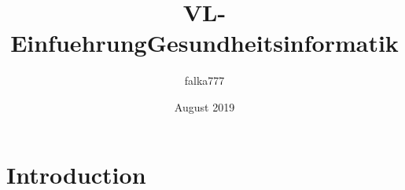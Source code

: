 \documentclass{article}
\title{VL-EinfuehrungGesundheitsinformatik}
\author{falka777 }
\date{August 2019}
\begin{document}
\maketitle

\section{Introduction}
\end{document}
